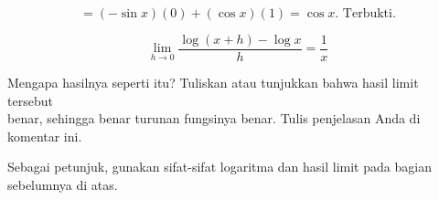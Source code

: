 \documentclass[a4paper,10pt]{article}
\begin{document}
\begin{eulernotebook}
\begin{eulercomment}
\begin{eulercomment}
\begin{eulercomment}
\begin{eulercomment}
\begin{eulercomment}
\begin{eulercomment}
\begin{eulercomment}
\begin{eulercomment}
\begin{eulerformula}
\[
\text{$=(-\sin x)(0)+(\cos x)(1)=\cos x$. Terbukti.}
\]
\end{eulerformula}
\begin{eulerformula}
\[
\lim_{h\rightarrow 0}{\frac{\log \left(x+h\right)-\log x}{h}}=
 \frac{1}{x}
\]
\end{eulerformula}
\begin{eulercomment}
Mengapa hasilnya seperti itu? Tuliskan atau tunjukkan bahwa hasil
limit tersebut\\
benar, sehingga benar turunan fungsinya benar.  Tulis penjelasan Anda
di komentar ini.

Sebagai petunjuk, gunakan sifat-sifat logaritma dan hasil limit pada
bagian sebelumnya di atas.


\end{eulercomment}
\end{eulercomment}
\end{eulercomment}
\end{eulercomment}
\end{eulercomment}
\end{eulercomment}
\end{eulercomment}
\end{eulercomment}
\end{eulercomment}
\end{eulernotebook}
\end{document}
